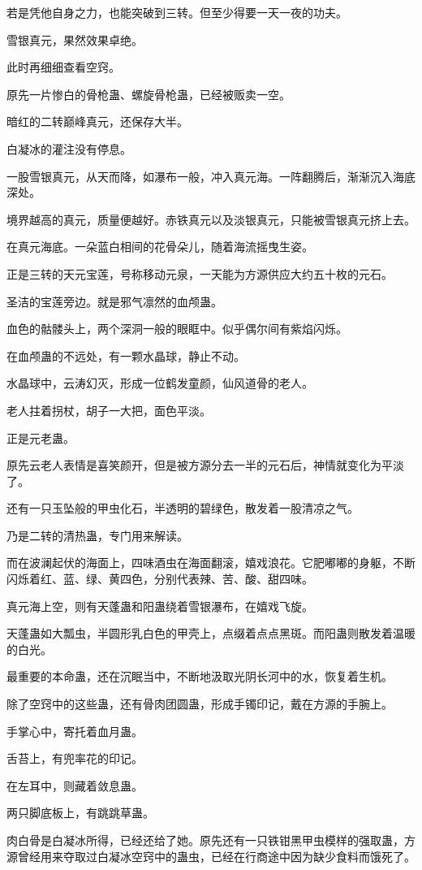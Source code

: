 \begin{this_body}
若是凭他自身之力，也能突破到三转。但至少得要一天一夜的功夫。

雪银真元，果然效果卓绝。

此时再细细查看空窍。

原先一片惨白的骨枪蛊、螺旋骨枪蛊，已经被贩卖一空。

暗红的二转巅峰真元，还保存大半。

白凝冰的灌注没有停息。

一股雪银真元，从天而降，如瀑布一般，冲入真元海。一阵翻腾后，渐渐沉入海底深处。

境界越高的真元，质量便越好。赤铁真元以及淡银真元，只能被雪银真元挤上去。

在真元海底。一朵蓝白相间的花骨朵儿，随着海流摇曳生姿。

正是三转的天元宝莲，号称移动元泉，一天能为方源供应大约五十枚的元石。

圣洁的宝莲旁边。就是邪气凛然的血颅蛊。

血色的骷髅头上，两个深洞一般的眼眶中。似乎偶尔间有紫焰闪烁。

在血颅蛊的不远处，有一颗水晶球，静止不动。

水晶球中，云涛幻灭，形成一位鹤发童颜，仙风道骨的老人。

老人拄着拐杖，胡子一大把，面色平淡。

正是元老蛊。

原先云老人表情是喜笑颜开，但是被方源分去一半的元石后，神情就变化为平淡了。

还有一只玉坠般的甲虫化石，半透明的碧绿色，散发着一股清凉之气。

乃是二转的清热蛊，专门用来解读。

而在波澜起伏的海面上，四味酒虫在海面翻滚，嬉戏浪花。它肥嘟嘟的身躯，不断闪烁着红、蓝、绿、黄四色，分别代表辣、苦、酸、甜四味。

真元海上空，则有天蓬蛊和阳蛊绕着雪银瀑布，在嬉戏飞旋。

天蓬蛊如大瓢虫，半圆形乳白色的甲壳上，点缀着点点黑斑。而阳蛊则散发着温暖的白光。

最重要的本命蛊，还在沉眠当中，不断地汲取光阴长河中的水，恢复着生机。

除了空窍中的这些蛊，还有骨肉团圆蛊，形成手镯印记，戴在方源的手腕上。

手掌心中，寄托着血月蛊。

舌苔上，有兜率花的印记。

在左耳中，则藏着敛息蛊。

两只脚底板上，有跳跳草蛊。

肉白骨是白凝冰所得，已经还给了她。原先还有一只铁钳黑甲虫模样的强取蛊，方源曾经用来夺取过白凝冰空窍中的蛊虫，已经在行商途中因为缺少食料而饿死了。


\end{this_body}
